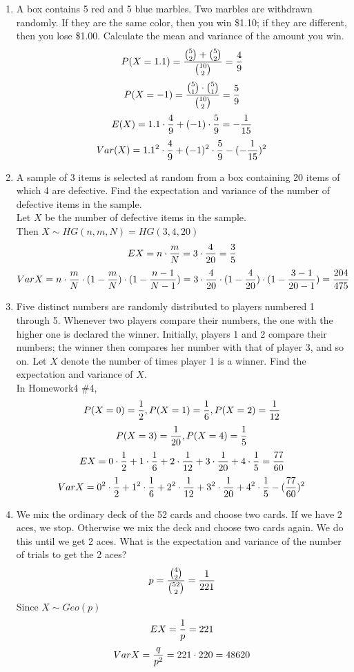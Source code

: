 \documentclass[12pt]{article}%
\newcommand{\0}{{\bf 0}}
\begin{document}
\begin{enumerate}
\item
A box contains 5 red and 5 blue marbles. Two marbles are withdrawn randomly. 
If they are the same color, then you win \$1.10; if they are different, then you  lose \$1.00. Calculate the mean and variance of the amount you win.
\\
{\color{blue}{\bf Sol.}}
$$P(X=1.1)=\frac{{5 \choose 2}+{5 \choose 2}}{{10 \choose 2}}=\frac{4}{9}$$
$$P(X=-1)=\frac{{5 \choose 1}\cdot{5 \choose 1}}{{10 \choose 2}}=\frac{5}{9}$$
$$E(X)=1.1\cdot\frac{4}{9}+(-1)\cdot\frac{5}{9}=-\frac{1}{15}$$
$$Var(X)=1.1^2\cdot\frac{4}{9}+(-1)^2\cdot\frac{5}{9}-(-\frac{1}{15})^2$$




\item
A sample of 3 items is selected at random from a box containing 20 items of which 4 are defective. 
Find the expectation and variance of the number of defective items in the sample.
\\
{\color{blue}{\bf Sol.}}
Let $X$ be the number of defective items in the sample.\\
Then $X \sim HG(n,m,N)=HG(3,4,20) $\\
$$EX=n\cdot \frac{m}{N}=3\cdot\frac{4}{20}=\frac{3}{5}$$
$$VarX=n\cdot \frac{m}{N}\cdot(1-\frac{m}{N})\cdot(1-\frac{n-1}{N-1})=3\cdot\frac{4}{20}\cdot(1-\frac{4}{20})\cdot(1-\frac{3-1}{20-1})=\frac{204}{475}$$





\item
Five distinct numbers are randomly distributed 
to players numbered 1 through 5. 
Whenever two players compare their numbers, 
the one with the higher one is declared the winner. 
Initially, players 1 and 2 compare their numbers; 
the winner then compares her number with that of player 3, and so on. 
Let $X$ denote the number of times player 1 is a winner. 
Find the expectation and variance of $X$.
\\
{\color{blue}{\bf Sol.}}
In Homework4 \#4,
$$P(X=0)=\frac{1}{2},P(X=1)=\frac{1}{6},P(X=2)=\frac{1}{12} $$
$$P(X=3)=\frac{1}{20},P(X=4)=\frac{1}{5}$$
$$EX=0\cdot\frac{1}{2}+1\cdot\frac{1}{6}+2\cdot\frac{1}{12} + 3\cdot\frac{1}{20}+4\cdot\frac{1}{5}=\frac{77}{60}$$
$$VarX=0^2\cdot\frac{1}{2}+1^2\cdot\frac{1}{6}+2^2\cdot\frac{1}{12} + 3^2\cdot\frac{1}{20}+4^2\cdot\frac{1}{5}-(\frac{77}{60})^2$$





\item
We mix the ordinary deck of the 52 cards and choose two cards.
If we have 2 aces, we stop.
Otherwise we mix the deck and choose two cards again.
We do this until we get 2 aces.
What is the expectation and variance of the number of trials to get the 2 aces?
\\
{\color{blue}{\bf Sol.}}
$$p=\frac{{4 \choose 2}}{{52 \choose 2}}=\frac{1}{221}$$
Since $X \sim Geo(p)$
$$EX=\frac{1}{p}=221$$
$$VarX=\frac{q}{p^2}=221\cdot220=48620$$





\end{enumerate}
\end{document}
